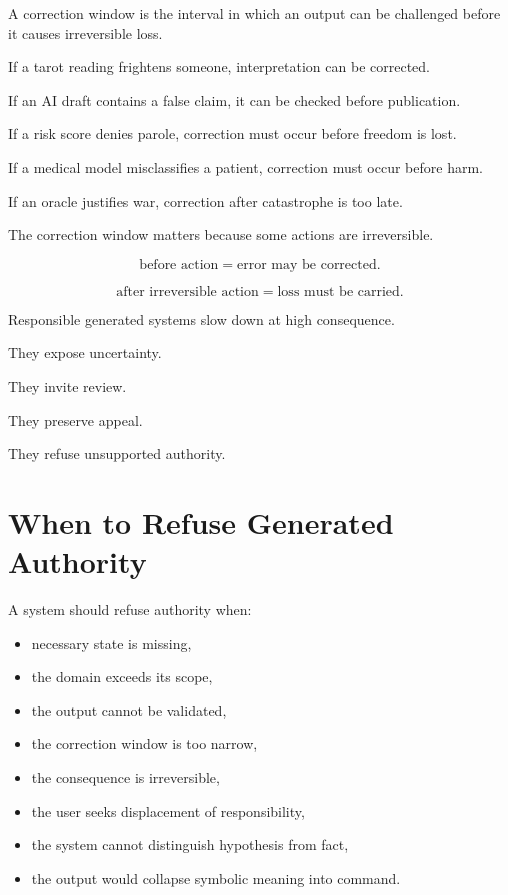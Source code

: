 \documentclass[11pt]{book}
\begin{document}
A correction window is the interval in which an output can be challenged before it causes irreversible loss.

If a tarot reading frightens someone, interpretation can be corrected.

If an AI draft contains a false claim, it can be checked before publication.

If a risk score denies parole, correction must occur before freedom is lost.

If a medical model misclassifies a patient, correction must occur before harm.

If an oracle justifies war, correction after catastrophe is too late.

The correction window matters because some actions are irreversible.

\[
\text{before action} = \text{error may be corrected}.
\]

\[
\text{after irreversible action} = \text{loss must be carried}.
\]

Responsible generated systems slow down at high consequence.

They expose uncertainty.

They invite review.

They preserve appeal.

They refuse unsupported authority.

\section{When to Refuse Generated Authority}

A system should refuse authority when:

\begin{itemize}
    \item necessary state is missing,
    \item the domain exceeds its scope,
    \item the output cannot be validated,
    \item the correction window is too narrow,
    \item the consequence is irreversible,
    \item the user seeks displacement of responsibility,
    \item the system cannot distinguish hypothesis from fact,
    \item the output would collapse symbolic meaning into command.
\end{itemize}
\end{document}

